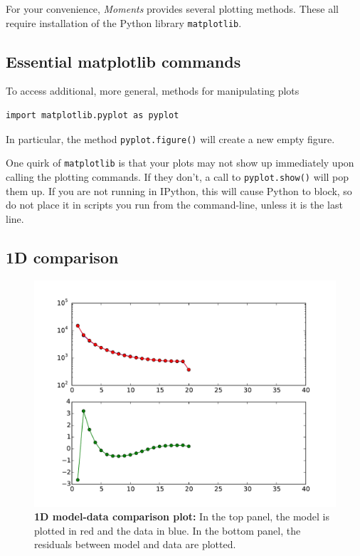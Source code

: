 \documentclass[12pt]{article}
\makeatletter
\newcommand{\py}[1]{\lstinline[breaklines=true,language=Python, showstringspaces=False]@#1@}
\makeatother
\begin{document}
For your convenience, \textit{Moments} provides several plotting methods.
These all require installation of the Python library \py{matplotlib}.

\subsection{Essential matplotlib commands}
To access additional, more general, methods for manipulating plots
\begin{lstlisting}
import matplotlib.pyplot as pyplot
\end{lstlisting}
In particular, the method \py{pyplot.figure()} will create a new empty figure.

One quirk of \py{matplotlib} is that your plots may not show up immediately upon calling the plotting commands.
If they don't, a call to \py{pyplot.show()} will pop them up.
If you are not running in IPython, this will cause Python to block, so do not place it in scripts you run from the command-line, unless it is the last line.

\subsection{1D comparison}

\begin{figure}
\centering
\includegraphics[scale=0.5]{1d_comp}
\caption{\textbf{1D model-data comparison plot:} In the top panel, the model is plotted in red and the data in blue. In the bottom panel, the residuals between model and data are plotted.\label{fig:1d_comp}}
\end{figure}
\end{document}
